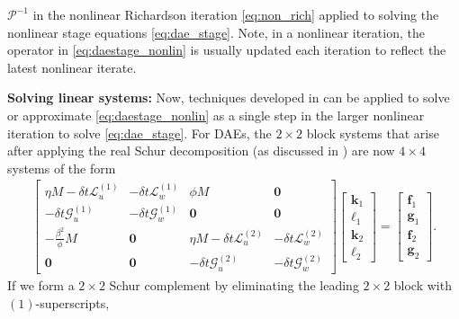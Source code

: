 \documentclass[review]{siamart}
\begin{document}
$\mathcal{P}^{-1}$ in the nonlinear Richardson iteration \eqref{eq:non_rich}
applied to solving the nonlinear stage equations \eqref{eq:dae_stage}. Note,
in a nonlinear iteration, the operator in \eqref{eq:daestage_nonlin} is
usually updated each iteration to reflect the latest nonlinear iterate.


\textbf{Solving linear systems:}
Now, techniques developed in  can be applied to solve
or approximate \eqref{eq:daestage_nonlin} as a single step in the larger
nonlinear iteration to solve \eqref{eq:dae_stage}. For DAEs, the $2\times 2$
block systems that arise after applying the real Schur decomposition (as
discussed in ) are now $4\times 4$ systems of
the form
%
\begin{align}\label{eq:dae_block}
\begin{bmatrix} \eta M - \delta t\mathcal{L}_{u}^{(1)} & -\delta t\mathcal{L}_{w}^{(1)}
		& \phi M & \mathbf{0} \\
	-\delta t\mathcal{G}_{u}^{(1)} & -\delta t\mathcal{G}_w^{(1)}
		& \mathbf{0} & \mathbf{0} \\
	-\tfrac{\beta^2}{\phi}M & \mathbf{0} & \eta M - \delta t\mathcal{L}_{u}^{(2)} &
		-\delta t\mathcal{L}_{w}^{(2)} \\
	\mathbf{0} & \mathbf{0} & -\delta t\mathcal{G}_{u}^{(2)} &
		-\delta t\mathcal{G}_w^{(2)} \end{bmatrix}
	\begin{bmatrix} \mathbf{k}_1 \\ \boldsymbol{\ell}_1 \\
		 \mathbf{k}_2 \\ \boldsymbol{\ell}_2 \end{bmatrix}
	= 	\begin{bmatrix} \mathbf{f}_1 \\ \mathbf{g}_1 \\
		 \mathbf{f}_2 \\ \mathbf{g}_2 \end{bmatrix}.
\end{align}
%
If we form a $2\times 2$ Schur complement by eliminating the leading
$2\times 2$ block with $(1)$-superscripts,
%
\end{document}

